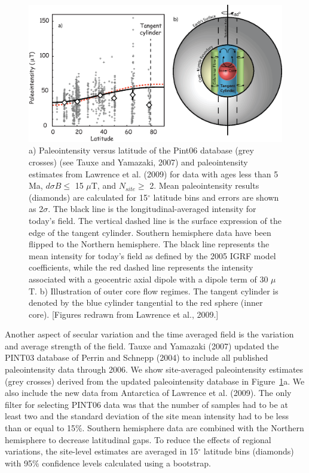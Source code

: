 \begin{figure}[htb]
\centering  \includegraphics[width=14.5 cm]{EPSfiles/tangent.eps}
\caption{ a)   Paleointensity versus latitude of the Pint06 database (grey crosses) (see Tauxe and
Yamazaki, 2007)  and paleointensity estimates from Lawrence et al. (2009) for data with
ages less than 5 Ma, $d\sigma B \le$ 15 $\mu$T, and $N_{site} \ge$ 2. Mean paleointensity results (diamonds) are calculated for 15$^{\circ}$ latitude bins and errors are shown as 2$\sigma$. The black line
is the longitudinal-averaged intensity for today's field. The vertical dashed line is the
surface expression of the edge of the tangent cylinder.  Southern
hemisphere data have been flipped to the Northern hemisphere. The black line represents
the mean intensity for today's field as defined by the 2005 IGRF model coefficients,
while the red dashed  line represents the intensity associated with a geocentric axial dipole with
a dipole term of 30 $\mu$T.  b)  Illustration of outer core flow regimes. The tangent cylinder is denoted by the blue
 cylinder tangential to the red sphere (inner core). [Figures redrawn from Lawrence et al., 2009.] }
\label{fig:tangent}
\end{figure}
\nocite{lawrence08,tauxe07}
\clearpage

Another aspect of secular variation and the time averaged field is the variation and average strength of the field.  
Tauxe and Yamazaki (2007) \nocite{tauxe07} updated the 
PINT03 database of 
Perrin and Schnepp (2004) \nocite{perrin04}  to include all published paleointensity data through 2006.   We show site-averaged paleointensity estimates
 (grey crosses) derived from the updated paleointensity database  in  Figure~\ref{fig:tangent}a.  We also include the new data from Antarctica of Lawrence et al. (2009).   The only filter for selecting
PINT06 data was that the number of samples had to be at least two and the standard deviation of the site mean intensity had to be less than or equal to 15\%.   Southern hemisphere data are combined with the Northern hemisphere to decrease latitudinal gaps. To reduce the effects of regional variations, the site-level estimates are averaged in 15$^{\circ}$ latitude bins (diamonds) with 95\% confidence levels calculated using a    bootstrap.

